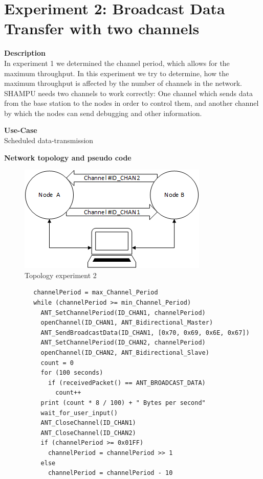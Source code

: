 \section{Experiment 2: Broadcast Data Transfer with two channels}
\begin{description} 
	\item{\textbf{Description}} \hfill \\ In experiment 1 we determined the channel period, which allows for the maximum throughput. In this experiment we try to determine, how the maximum throughput is affected by the number of channels in the network. SHAMPU needs two channels to work correctly: One channel which sends data from the base station to the nodes in order to control them, and another channel by which the nodes can send debugging and other information.
	\item{\textbf{Use-Case}} \hfill \\ Scheduled data-transmission	
	\item{\textbf{Network topology and pseudo code}} \hfill
	\begin{figure}[H]
		\centering
		\includegraphics[scale=1]{content/images/exp2_topo.png}
		\caption{Topology experiment 2}
	\end{figure}
	\begin{code}[H]
		\begin{verbatim}
		channelPeriod = max_Channel_Period
		while (channelPeriod >= min_Channel_Period) 
		  ANT_SetChannelPeriod(ID_CHAN1, channelPeriod)
		  openChannel(ID_CHAN1, ANT_Bidirectional_Master)
		  ANT_SendBroadcastData(ID_CHAN1, [0x70, 0x69, 0x6E, 0x67])
		  ANT_SetChannelPeriod(ID_CHAN2, channelPeriod)
		  openChannel(ID_CHAN2, ANT_Bidirectional_Slave)
		  count = 0
		  for (100 seconds) 
		    if (receivedPacket() == ANT_BROADCAST_DATA)
		      count++			
		  print (count * 8 / 100) + " Bytes per second"
		  wait_for_user_input()
		  ANT_CloseChannel(ID_CHAN1)
		  ANT_CloseChannel(ID_CHAN2)
		  if (channelPeriod >= 0x01FF)
		    channelPeriod = channelPeriod >> 1
		  else
		    channelPeriod = channelPeriod - 10
		 \end{verbatim}
		\caption{Broadcast data transfer two channels (Master)}\label{lst:mExp2}
	\end{code}
	

\end{description}
